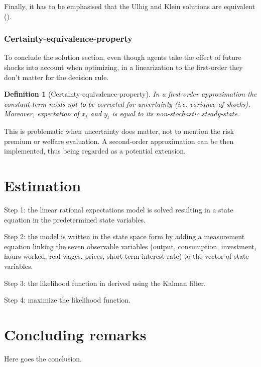 \documentclass{pracamgr}
\numberwithin{equation}{section}
\newtheorem{mydef}{Definition}
\begin{document}
Finally, it has to be emphasised that the Ulhig and Klein solutions are equivalent (\citet{bonaldi2010identification}).

\subsection{Certainty-equivalence-property}

To conclude the solution section, even though agents take the effect of future shocks into account when optimizing, in a linearization to the first-order they don't matter for the decision rule.

\begin{mydef}[Certainty-equivalence-property]
In a first-order approximation the constant term needs not to be corrected for uncertainty (i.e. variance of shocks). Moreover, expectation of $x_t$ and $y_t$ is equal to its non-stochastic steady-state.
\end{mydef}

This is problematic when uncertainty does matter, not to mention the risk premium or welfare evaluation. A second-order approximation can be then implemented, thus being regarded as a potential extension.

\chapter{Estimation}

Step 1: the linear rational expectations model is solved resulting in a state equation in the predetermined state variables.

Step 2: the model is written in the state space form by adding a measurement equation linking the seven observable variables (output, consumption, investment, hours worked, real wages, prices, short-term interest rate) to the vector of state variables.

Step 3: the likelihood function in derived using the Kalman filter.

Step 4: maximize the likelihood function.

\chapter{Concluding remarks} \label{Concluding remarks}

Here goes the conclusion.

\newpage

\nocite{*}

\end{document}
